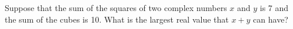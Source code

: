 Suppose that the sum of the squares of two complex numbers $x$ and $y$ is 7 and the sum of the cubes is 10.  What is the largest real value that $x + y$ can have?
